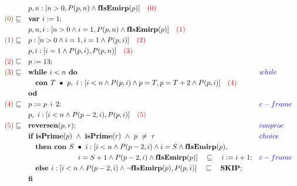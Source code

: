 \documentclass[a4paper]{article}
\begin{document}
\begin{align*}
		&\quad p, n:[n>0, P(p, n) \land \textbf{fIsEmirp}(p)] \quad\textcolor{red}{(0)}\\
		\textcolor{red}{(0)} \sqsubseteq &\quad \textbf{var } i := 1; \\
		&\quad p, n, i:[ n > 0 \land i = 1, P(p, n) \land \textbf{fIsEmirp}(p)] \quad\textcolor{red}{(1)} \\
		\textcolor{red}{(1)} \sqsubseteq &\quad p:[n > 0 \land i = 1, i = 1 \land P(p, i)] \quad\textcolor{red}{(2)}\\
		&\quad p, i:[i = 1 \land P(p, i), P(p, n)] \quad\textcolor{red}{(3)}\\
		\textcolor{red}{(2)} \sqsubseteq &\quad p := 13; \\
		\textcolor{red}{(3)} \sqsubseteq &\quad \textbf{while } i < n \textbf{ do} &&\textcolor{blue}{while}\\
		&\qquad \textbf{con } T\ \bullet\ p,\ i:[i < n \land P(p, i) \land p = T, p = T + 2 \land P(p, i)] \quad\textcolor{red}{(4)}\\ 
		&\quad \textbf{od}\\
		\textcolor{red}{(4)} \sqsubseteq &\quad p := p + 2; &&\textcolor{blue}{c-frame}\\
		&\quad p,\ i:[i < n \land P(p-2, i), P(p, i)]\quad\textcolor{red}{(5)} \\
		\textcolor{red}{(5)}\sqsubseteq&\quad \textbf{reversen}(p, r); &&\textcolor{blue}{conproc}\\
		&\quad \textbf{if } \textbf{isPrime}(p)\ \land\ \textbf{isPrime}(r)\ \land\ p\ \neq\ r &&\textcolor{blue}{choice}\\
		&\qquad \textbf{then }\textbf{con } S\ \bullet\ i:[i < n \land P(p-2, i) \land i = S \land \textbf{fIsEmirp}(p),\\
		&\qquad \qquad \qquad \qquad i = S + 1 \land P(p-2, i) \land \textbf{fIsEmirp}(p)] \quad \sqsubseteq\quad i := i + 1; &&\textcolor{blue}{c-frame}\\
		&\qquad \textbf{else } i:[i < n \land P(p-2, i) \land \neg \textbf{fIsEmirp}(p), P(p, i)]\quad\sqsubseteq\quad \textbf{SKIP};\\
		&\quad \textbf{fi} \\
\end{align*}
\end{document}
